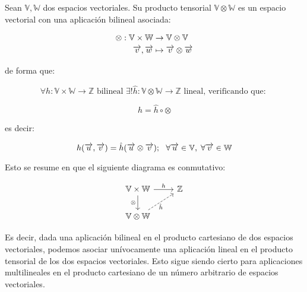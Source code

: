 \begin{teorema} Sean $\mathbb{V}, \mathbb{W}$ dos espacios vectoriales. Su producto tensorial $\mathbb{V} \otimes \mathbb{W}$ es un espacio vectorial con una aplicación bilineal asociada:

\begin{equation}
\begin{split}
    \otimes : \mathbb{V} \times \mathbb{W} &\to \mathbb{V} \otimes \mathbb{V} \\
    \overrightarrow{v}, \overrightarrow{w} & \mapsto \overrightarrow{v} \otimes \overrightarrow{w}
\end{split}
\end{equation}

de forma que:

\begin{equation}
    \forall h: \mathbb{V} \times \mathbb{W} \to \mathbb{Z} \text{  bilineal  } \exists! \hat{h}: \mathbb{V} \otimes \mathbb{W} \to \mathbb{Z} \text{  lineal, verificando que: }
\end{equation}

\begin{equation}
    h = \hat{h} \circ \otimes
\end{equation}

es decir:

\begin{equation}
    h(\overrightarrow{u}, \overrightarrow{v}) = \hat{h}(\overrightarrow{u} \otimes \overrightarrow{v});
    \ \  \forall \overrightarrow{u} \in \mathbb{V}, \; \forall \overrightarrow{v} \in \mathbb{W}
\end{equation}

Esto se resume en que el siguiente diagrama es conmutativo:

\begin{equation}
\begin{tikzcd}
    \mathbb{V} \times \mathbb{W} \ar{r}{h} \ar{d}[left]{\otimes} & \mathbb{Z} \\
    \mathbb{V} \otimes \mathbb{W} \ar[dashed]{ur}[right, below]{\hat{h}}
\end{tikzcd}
\end{equation}

\end{teorema}

Es decir, dada una aplicación bilineal en el producto cartesiano de dos espacios vectoriales, podemos asociar unívocamente una aplicación lineal en el producto tensorial de los dos espacios vectoriales. Esto sigue siendo cierto para aplicaciones multilineales en el producto cartesiano de un número arbitrario de espacios vectoriales.

